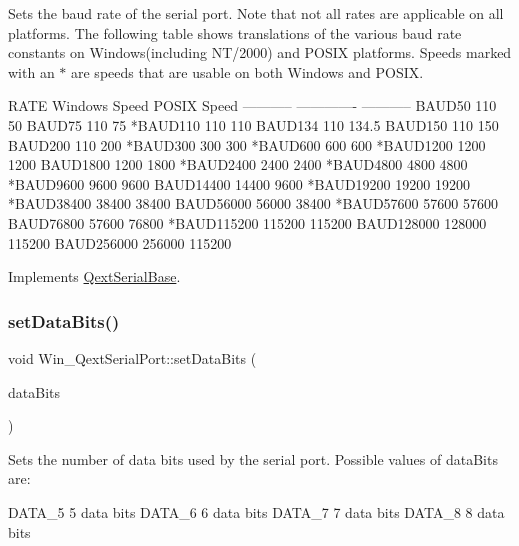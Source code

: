 Sets the baud rate of the serial port. Note that not all rates are applicable on all platforms. The following table shows translations of the various baud rate constants on Windows(including N\+T/2000) and P\+O\+S\+IX platforms. Speeds marked with an $\ast$ are speeds that are usable on both Windows and P\+O\+S\+IX. \begin{DoxyVerb}  RATE          Windows Speed   POSIX Speed
  -----------   -------------   -----------
   BAUD50                 110          50
   BAUD75                 110          75
  *BAUD110                110         110
   BAUD134                110         134.5
   BAUD150                110         150
   BAUD200                110         200
  *BAUD300                300         300
  *BAUD600                600         600
  *BAUD1200              1200        1200
   BAUD1800              1200        1800
  *BAUD2400              2400        2400
  *BAUD4800              4800        4800
  *BAUD9600              9600        9600
   BAUD14400            14400        9600
  *BAUD19200            19200       19200
  *BAUD38400            38400       38400
   BAUD56000            56000       38400
  *BAUD57600            57600       57600
   BAUD76800            57600       76800
  *BAUD115200          115200      115200
   BAUD128000          128000      115200
   BAUD256000          256000      115200
\end{DoxyVerb}
 

Implements \mbox{\hyperlink{class_qext_serial_base}{Qext\+Serial\+Base}}.

\mbox{\label{class_win___qext_serial_port_a33168191b03365b429b8413f6286f4c8}} 
\subsubsection{\texorpdfstring{set\+Data\+Bits()}{setDataBits()}}
{\footnotesize\ttfamily void Win\+\_\+\+Qext\+Serial\+Port\+::set\+Data\+Bits (\begin{DoxyParamCaption}\item[{Data\+Bits\+Type}]{data\+Bits }\end{DoxyParamCaption})\hspace{0.3cm}{\ttfamily [virtual]}}

Sets the number of data bits used by the serial port. Possible values of data\+Bits are\+: \begin{DoxyVerb}    DATA_5      5 data bits
    DATA_6      6 data bits
    DATA_7      7 data bits
    DATA_8      8 data bits
\end{DoxyVerb}


